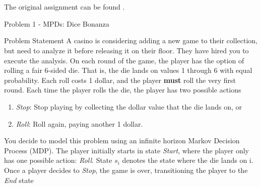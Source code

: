 \clearpage

\chapter{\documentName}
\section{\documentName}

\testimonial

The original assignment can be found .

\begin{problem}{Problem 1 - MPDs: Dice Bonanza}
    \begin{statement}{Problem Statement}
        A casino is considering adding a new game to their collection, but need to analyze it before releasing it on their floor. They have hired you to execute the analysis. On each round of the game, 
        the player has the option of rolling a fair 6-sided die. That is, the die lands on values 1 through 6 with equal probability. Each roll costs 1 dollar, and the player \textbf{must} roll the very 
        first round. Each time the player rolls the die, the player has two possible actions

        \begin{enumerate}
            \item \textit{Stop}: Stop playing by collecting the dollar value that the die lands on, or
            \item \textit{Roll}: Roll again, paying another 1 dollar.
        \end{enumerate}
        You decide to model this problem using an infinite horizon Markov Decision Process (MDP). The player initially starts in state \textit{Start}, where the player only has one possible action: 
        \textit{Roll}. State $s_{i}$ denotes the state where the die lands on i. Once a player decides to \textit{Stop}, the game is over, transitioning the player to the \textit{End} state


\end{statement}
\end{problem}
